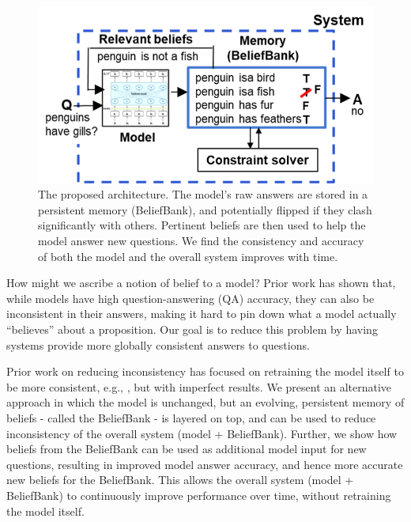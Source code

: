 \documentclass[11pt]{article}
\begin{document}
\begin{figure}[t]
\centering
     \includegraphics[width=1\columnwidth]{architecture2.png}	   %
\caption{The proposed architecture. The model's raw answers are stored in a
persistent memory (BeliefBank), and potentially flipped if they clash
significantly with others. Pertinent beliefs are then used to help the model answer new
questions. We find the consistency and accuracy of both the model and the overall
system improves with time. \label{architecture}}
\end{figure}

How might we ascribe a notion of belief to a model? Prior work has shown that, while
models have high question-answering (QA) accuracy, they can also be inconsistent in their
answers, making it hard to pin down what a model actually ``believes'' about a proposition.
Our goal is to reduce this problem by having systems provide more globally consistent
answers to questions.

Prior work on reducing inconsistency has focused on retraining the model itself to be
more consistent, e.g., \cite{Ribeiro2019AreRR,Li2019ALF}, but with imperfect results. We present an
alternative approach in which the model is unchanged, but an evolving, persistent memory
of beliefs - called the BeliefBank - is layered on top, and can be used
to reduce inconsistency of the overall system (model + BeliefBank). Further,
we show how beliefs from the BeliefBank can be used as additional model
input for new questions, resulting in improved model answer accuracy,
and hence more accurate new beliefs for the BeliefBank. This allows the
overall system (model + BeliefBank) to continuously improve performance over
time, without retraining the model itself.
\end{document}
